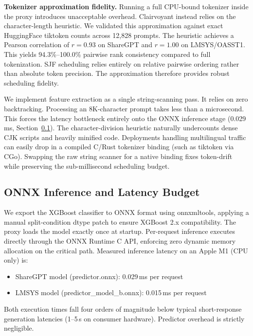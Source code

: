 \documentclass[10pt]{article}
\begin{document}
\textbf{Tokenizer approximation fidelity.} Running a full CPU-bound tokenizer inside the proxy introduces unacceptable overhead. Clairvoyant instead relies on the character-length heuristic. We validated this approximation against exact HuggingFace tiktoken counts across 12,828 prompts. The heuristic achieves a Pearson correlation of $r=0.93$ on ShareGPT and $r=1.00$ on LMSYS/OASST1. This yields 94.3\%–100.0\% pairwise rank consistency compared to full tokenization. SJF scheduling relies entirely on relative pairwise ordering rather than absolute token precision. The approximation therefore provides robust scheduling fidelity.

We implement feature extraction as a single string-scanning pass. It relies on zero backtracking. Processing an 8K-character prompt takes less than a microsecond. This forces the latency bottleneck entirely onto the ONNX inference stage (0.029\,ms, Section~\ref{sec:onnx}). The character-division heuristic naturally undercounts dense CJK scripts and heavily minified code. Deployments handling multilingual traffic can easily drop in a compiled C/Rust tokenizer binding (such as tiktoken via CGo). Swapping the raw string scanner for a native binding fixes token-drift while preserving the sub-millisecond scheduling budget.

\subsection{ONNX Inference and Latency Budget}
\label{sec:onnx}

We export the XGBoost classifier to ONNX format using onnxmltools, applying a manual split-condition dtype patch to ensure XGBoost 2.x compatibility. The proxy loads the model exactly once at startup. Per-request inference executes directly through the ONNX Runtime C API, enforcing zero dynamic memory allocation on the critical path. Measured inference latency on an Apple M1 (CPU only) is:

\begin{itemize}
\item ShareGPT model (predictor.onnx): 0.029\,ms per request
\item LMSYS model (predictor\_model\_b.onnx): 0.015\,ms per request
\end{itemize}

Both execution times fall four orders of magnitude below typical short-response generation latencies (1–5\,s on consumer hardware). Predictor overhead is strictly negligible.
\end{document}
